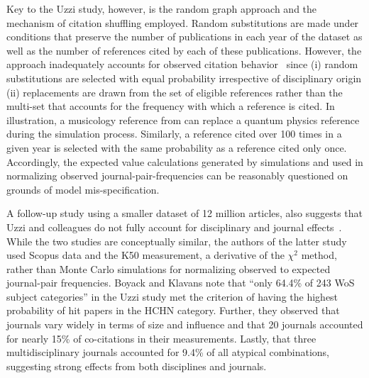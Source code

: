 \documentclass[NETN]{stjour}
\begin{document}
Key to the Uzzi study, however, is the random graph approach and the mechanism of citation shuffling employed. Random substitutions are made under conditions that preserve the number of publications in each year of the dataset as well as the number of references cited by each of these publications. However, the approach inadequately accounts for observed citation behavior~\citep{wallace_lariviere_gingras_2012,moed_measuring_2010,klavans_research_2017,garfield_1979} since (i) random substitutions are selected with equal probability irrespective of disciplinary origin (ii) replacements are drawn from the set of eligible references rather than the multi-set that accounts for the frequency with which a reference is cited. In illustration, a musicology reference from can replace a quantum physics reference during the simulation process. Similarly, a reference cited over 100 times in a given year is selected with the same probability as a reference cited only once. Accordingly, the expected value calculations generated by simulations and used in normalizing observed journal-pair-frequencies can be reasonably questioned on grounds of model mis-specification. 

A follow-up study using a smaller dataset of 12 million articles, also suggests that Uzzi and colleagues do not fully account for disciplinary and journal effects~\citep{boyack_vs_uzzi_2014}. While the two studies are conceptually similar, the authors of the latter study used Scopus data and the K50 measurement, a derivative of the $\chi^2$ method, rather than Monte Carlo simulations for normalizing observed to expected journal-pair frequencies. Boyack and Klavans note that ``only 64.4\%  of  243  WoS  subject  categories'' in the Uzzi study met the criterion of having the highest probability of hit papers in the HCHN category. Further, they observed that journals vary widely in terms of size and influence and that 20 journals accounted for nearly 15\% of co-citations in their measurements. Lastly, that three multidisciplinary journals accounted for 9.4\% of all atypical combinations, suggesting strong effects from both disciplines and journals. 
\end{document}
